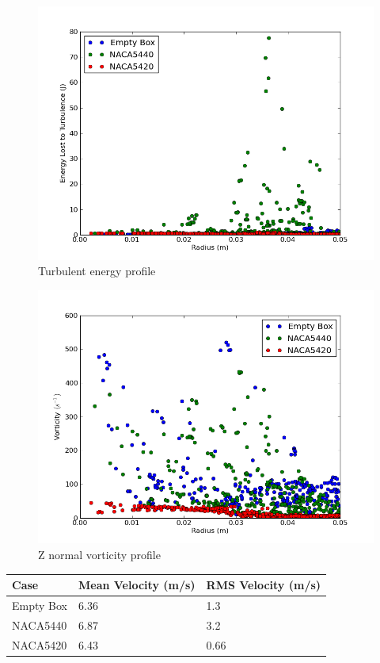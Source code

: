 \documentclass[12pt]{article}
\begin{document}
\begin{figure}[H]
\centering
\includegraphics[width=5in, clip=true, trim=0in 0in 0.5in 0.5in]{../images/turb_profile.png}
\caption{Turbulent energy profile}
\end{figure}

\begin{figure}[H]
\centering
\includegraphics[width=5in, clip=true, trim=0in 0in 0.5in 0.5in]{../images/vorticity_profile.png}
\caption{Z normal vorticity profile}
\end{figure}

\begin{tabular}{| l | l | l |}
\hline
Case & Mean Velocity (m/s) & RMS Velocity (m/s) \\
\hline
Empty Box & 6.36 & 1.3 \\
NACA5440 & 6.87 & 3.2 \\
NACA5420 & 6.43 & 0.66 \\
\hline
\end{tabular}
\end{document}
